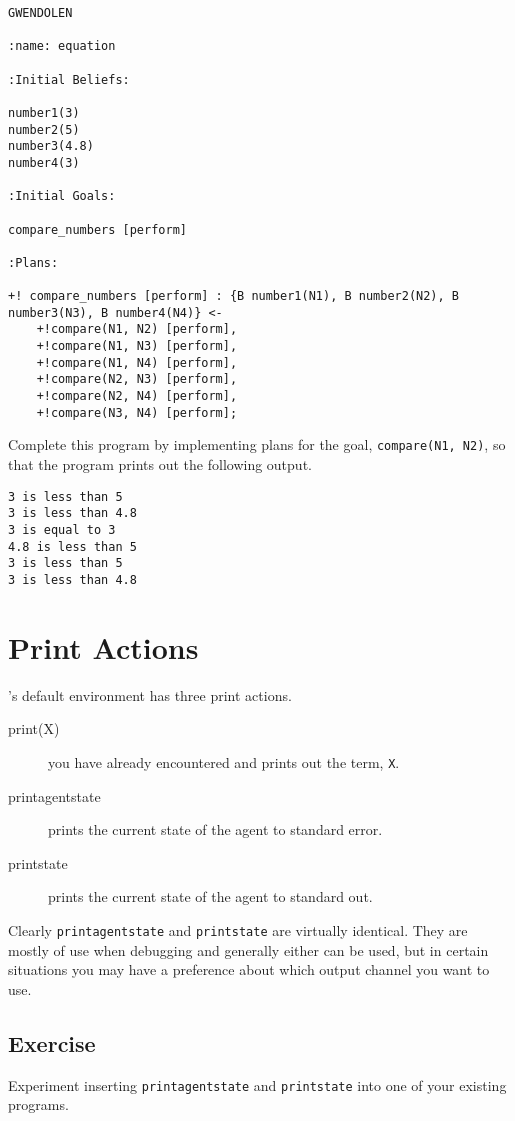 \documentclass[a4]{article}
\begin{document}
\begin{lstlisting}[float,caption=Number Comparison Program,basicstyle=\sffamily,style=easslisting,language=Gwendolen,label=code:equation]
GWENDOLEN

:name: equation

:Initial Beliefs:

number1(3)
number2(5)
number3(4.8)
number4(3)

:Initial Goals:

compare_numbers [perform]

:Plans:

+! compare_numbers [perform] : {B number1(N1), B number2(N2), B number3(N3), B number4(N4)} <-
	+!compare(N1, N2) [perform],
	+!compare(N1, N3) [perform],
	+!compare(N1, N4) [perform],
	+!compare(N2, N3) [perform],
	+!compare(N2, N4) [perform],
	+!compare(N3, N4) [perform];
\end{lstlisting}

Complete this program by implementing plans for the goal, \lstinline{compare(N1, N2)}, so that the program prints out the following output.

\begin{verbatim}
3 is less than 5
3 is less than 4.8
3 is equal to 3
4.8 is less than 5
3 is less than 5
3 is less than 4.8
\end{verbatim}

\section{Print Actions}

\gwendolen's default environment has three print actions.
\begin{description}
\item[print(X)] you have already encountered and prints out the term, \lstinline{X}.
\item[printagentstate] prints the current state of the agent to standard error.
\item[printstate] prints the current state of the agent to standard out.
\end{description}
Clearly \lstinline{printagentstate} and \lstinline{printstate} are virtually identical.  They are mostly of use when debugging and generally either can be used, but in certain situations you may have a preference about which output channel you want to use.

\subsection{Exercise}
Experiment inserting \lstinline{printagentstate} and \lstinline{printstate} into one of your existing programs.
\end{document}
